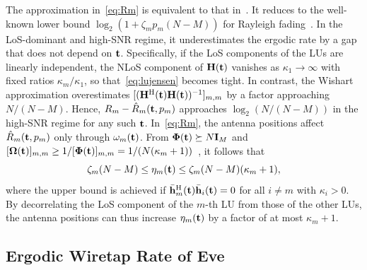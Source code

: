 \documentclass[journal]{IEEEtran}
\begin{document}
The approximation in~\eqref{eq:Rm} is equivalent to that in~\cite[Sec.~IV-A]{ZhengTCOM2025}. It reduces to the well-known lower bound $\log_2(1+\zeta_mp_m(N-M))$ for Rayleigh fading~\cite{Ngo2013}. In the LoS-dominant and high-SNR regime, it underestimates the ergodic rate by a gap that does not depend on $\mathbf{t}$. Specifically, if the LoS components of the LUs are linearly independent, the NLoS component of $\mathbf{H}(\mathbf{t})$ vanishes as $\kappa_1\to\infty$ with fixed ratios $\kappa_m/\kappa_1$, so that~\eqref{eq:lujensen} becomes tight. In contrast, the Wishart approximation overestimates $[(\mathbf{H}^{\mathrm H}(\mathbf{t})\mathbf{H}(\mathbf{t}))^{-1}]_{m,m}$ by a factor approaching $N/(N-M)$. Hence, $R_m-\hat R_m(\mathbf{t},p_m)$ approaches $\log_2(N/(N-M))$ in the high-SNR regime for any such $\mathbf{t}$. In~\eqref{eq:Rm}, the antenna positions affect $\hat R_m(\mathbf{t},p_m)$ only through $\omega_m(\mathbf{t})$. From $\boldsymbol{\Phi}(\mathbf{t})\succeq N\mathbf{I}_M$ and $[\boldsymbol{\Omega}(\mathbf{t})]_{m,m}\ge1/[\boldsymbol{\Phi}(\mathbf{t})]_{m,m}=1/(N(\kappa_m+1))$~\cite{Horn2013}, it follows that
\begin{equation}\label{eq:etabound}
\zeta_m(N-M)\le\eta_m(\mathbf{t})\le\zeta_m(N-M)(\kappa_m+1),
\end{equation}
where the upper bound is achieved if $\bar{\mathbf{h}}_m^{\mathrm H}(\mathbf{t})\bar{\mathbf{h}}_i(\mathbf{t})=0$ for all $i\neq m$ with $\kappa_i>0$. By decorrelating the LoS component of the $m$-th LU from those of the other LUs, the antenna positions can thus increase $\eta_m(\mathbf{t})$ by a factor of at most $\kappa_m+1$.

\subsection{Ergodic Wiretap Rate of Eve}\label{sec:eve}
\end{document}
